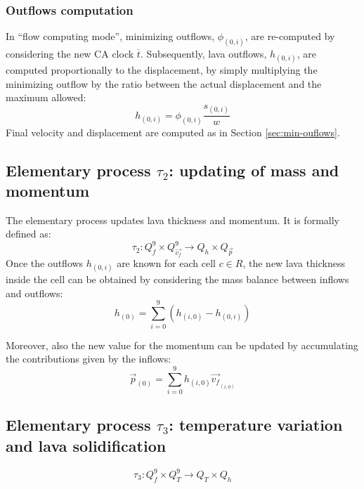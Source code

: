 \subsubsection{Outflows computation}
In ``flow computing mode'', minimizing outflows, $\phi_{(0,i)}$, are re-computed by considering the new CA clock $\overline{t}$. Subsequently, lava outflows, $h_{(0,i)}$, are computed proportionally to the displacement, by simply multiplying the minimizing outflow by the ratio between the actual displacement and the maximum allowed:
$$
h_{(0,i)} = \phi_{(0,i)} \frac{ s_{(0,i)} }{ w }
$$
Final velocity and displacement are computed as in Section \ref{sec:min-ouflows}.



\subsection{Elementary process $\tau_2$: updating of mass and
momentum}\label{sect:sciaraModelTau2} The elementary process updates lava
thickness and momentum.
It is formally defined as:
$$
\tau_2: Q_f^9 \times Q_{\overrightarrow{v_f}}^9 \to Q_h \times Q_{\overrightarrow{p}}
$$
Once the outflows $h_{(0,i)}$ are known for each cell $c \in R$, the new lava thickness inside the cell can be obtained by considering the mass balance between inflows and outflows:
$$
h_{(0)} = \sum_{i=0}^9 (h_{(i,0)} - h_{(0,i)})
$$

Moreover, also the new value for the momentum can be updated by accumulating the contributions given by the inflows:
$$
\overrightarrow{p}_{(0)} = \sum_{i=0}^9 h_{(i,0)} \overrightarrow{v_f}_{_{(i,0)}}
$$

\subsection{Elementary process $\tau_3$: temperature variation and lava
solidification}\label{sect:temperatureDrop}

$$
\tau_3: Q_f^9 \times Q_T^9 \to Q_T \times Q_h
$$

